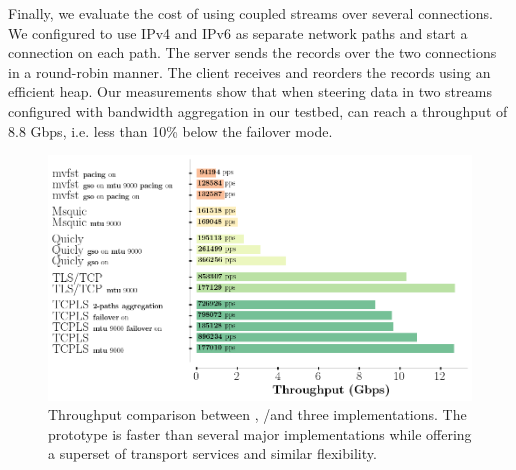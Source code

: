 Finally, we evaluate the cost of using coupled streams over several \tcp 
connections.
We configured \tcpls to use IPv4 and IPv6 as separate network paths and start a 
\tcp connection on each path. 
The \tcpls server sends the records over the two \tcp connections in a 
round-robin manner. The \tcpls client receives and reorders the records using an 
efficient heap.
Our measurements show that when steering data in two streams
configured with bandwidth aggregation in our testbed,
\tcpls can reach a throughput of 8.8 Gbps, i.e. less than 10\% below the
failover mode.

\begin{figure}[!t]
  \begin{center}
    \includegraphics[width=\columnwidth]{figures/perf_analysis.png}
  \end{center}
\vspace{-0.5cm}
  \caption{Throughput comparison between \tcpls, \tcp/\tls and three \quic 
  implementations.
    The
    \tcpls prototype is faster than several major \quic implementations while
    offering a superset of transport services and similar flexibility.}
  \label{fig:perf}
\end{figure}


